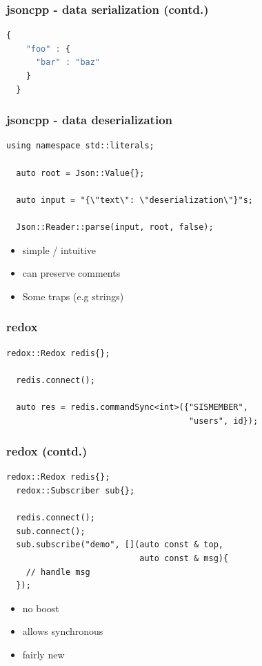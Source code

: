 \begin{frame}[fragile]
  \frametitle{jsoncpp - data serialization (contd.)}
  \begin{lstlisting}[language=Javascript]
  {
    "foo" : {
      "bar" : "baz"
    }
  }
  \end{lstlisting}
\end{frame}
\begin{frame}[fragile]
  \frametitle{jsoncpp - data deserialization}
  \begin{lstlisting}[language={[11]C++}]
  using namespace std::literals;
 
  auto root = Json::Value{};

  auto input = "{\"text\": \"deserialization\"}"s;

  Json::Reader::parse(input, root, false);
  \end{lstlisting}
\end{frame}
\begin{frame}
  \begin{itemize}
    \item simple / intuitive
    \item can preserve comments
    \item Some traps (e.g strings)
  \end{itemize}
\end{frame}
\begin{frame}[fragile]
  \frametitle{redox}
  \begin{lstlisting}[language={[11]C++}]
  redox::Redox redis{};

  redis.connect();

  auto res = redis.commandSync<int>({"SISMEMBER",
                                     "users", id});
  \end{lstlisting}
\end{frame}
\begin{frame}[fragile]
  \frametitle{redox (contd.)}
  \begin{lstlisting}[language={[11]C++}]
  redox::Redox redis{};
  redox::Subscriber sub{};

  redis.connect();
  sub.connect();
  sub.subscribe("demo", [](auto const & top,
                           auto const & msg){
    // handle msg
  });
  \end{lstlisting}
\end{frame}
\begin{frame}
  \begin{itemize}
    \item no boost
    \item allows synchronous
    \item fairly new
  \end{itemize}
\end{frame}
